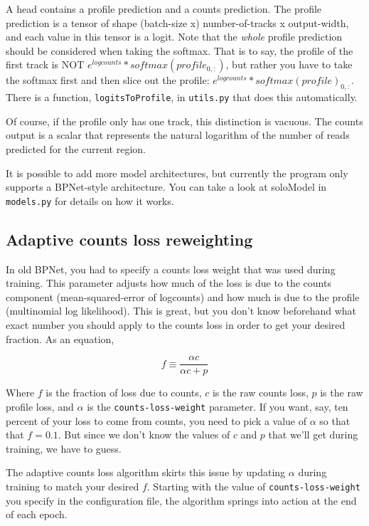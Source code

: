 \documentclass{article}
\begin{document}
A head contains a profile prediction and a counts prediction. The profile prediction is a tensor
of shape (batch-size x) number-of-tracks x output-width, and each value in this tensor is a logit.
Note that the \emph{whole} profile prediction should be considered when taking the softmax.
That is to say, the profile of the first track is NOT $e^{logcounts} * softmax(profile_{0,:})$,
but rather you have to take the softmax first and then slice out the profile:
$e^{logcounts} * softmax(profile)_{0,:}$. There is a function, \texttt{logitsToProfile}, in
\texttt{utils.py} that does this automatically.

Of course, if the profile only has one track, this distinction is vacuous.
The counts output is a scalar that represents the natural logarithm of the number of reads
predicted for the current region.

It is possible to add more model architectures, but currently the program only supports a
BPNet-style architecture.
You can take a look at soloModel in \texttt{models.py} for details on how it works.

\subsection{Adaptive counts loss reweighting}\label{sec:countsLossReweighting}
In old BPNet, you had to specify a counts loss weight that was used during training.
This parameter adjusts how much of the loss is due to the counts component
(mean-squared-error of logcounts) and how much is due to the profile (multinomial
log likelihood).
This is great, but you don't know beforehand what exact number you should apply to
the counts loss in order to get your desired fraction. As an equation,

\begin{equation}
    f \equiv \frac{\alpha c}{\alpha c + p}
\end{equation}

Where $f$ is the fraction of loss due to counts, $c$ is the raw counts loss, $p$ is the
raw profile loss, and $\alpha$ is the \texttt{counts-loss-weight} parameter.
If you want, say, ten percent of your loss to come from counts, you need to pick
a value of $\alpha$ so that that $f = 0.1$.
But since we don't know the values of $c$ and $p$ that we'll get during training,
we have to guess.

The adaptive counts loss algorithm skirts this issue by updating $\alpha$ during training
to match your desired $f$. Starting with the value of \texttt{counts-loss-weight} you
specify in the configuration file, the algorithm springs into action at the end of each epoch.
\end{document}
